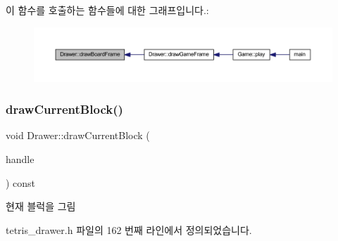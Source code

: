 이 함수를 호출하는 함수들에 대한 그래프입니다.\+:
\nopagebreak
\begin{figure}[H]
\begin{center}
\leavevmode
\includegraphics[width=350pt]{class_drawer_a72d01f53fc2c5ff15763dcd76a9b9395_icgraph}
\end{center}
\end{figure}
\mbox{\label{class_drawer_acef9be5772c0a3bdbae4f01d851e60f1}} 
\subsubsection{\texorpdfstring{draw\+Current\+Block()}{drawCurrentBlock()}}
{\footnotesize\ttfamily void Drawer\+::draw\+Current\+Block (\begin{DoxyParamCaption}\item[{const \mbox{\hyperlink{class_block_handler}{Block\+Handler}} \&}]{handle }\end{DoxyParamCaption}) const\hspace{0.3cm}{\ttfamily [inline]}}



현재 블럭을 그림 



tetris\+\_\+drawer.\+h 파일의 162 번째 라인에서 정의되었습니다.


